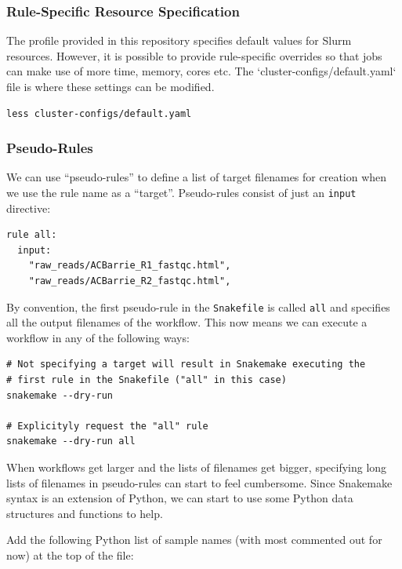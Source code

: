 \subsubsection{Rule-Specific Resource Specification}

The profile provided in this repository specifies default values for Slurm resources.
However, it is possible to provide rule-specific overrides so that jobs can make use of more time, memory, cores etc.
The `cluster-configs/default.yaml` file is where these settings can be modified.

\begin{lstlisting}
less cluster-configs/default.yaml
\end{lstlisting}

\subsubsection{Pseudo-Rules}

We can use ``pseudo-rules'' to define a list of target filenames for creation when we use the rule name as a ``target''.
Pseudo-rules consist of just an \texttt{input} directive:

\begin{lstlisting}
rule all:
  input:
    "raw_reads/ACBarrie_R1_fastqc.html",
    "raw_reads/ACBarrie_R2_fastqc.html",
\end{lstlisting}

By convention, the first pseudo-rule in the \texttt{Snakefile} is called \texttt{all} and specifies all the output filenames of the workflow.
This now means we can execute a workflow in any of the following ways:

\begin{lstlisting}
# Not specifying a target will result in Snakemake executing the
# first rule in the Snakefile ("all" in this case)
snakemake --dry-run

# Explicityly request the "all" rule
snakemake --dry-run all
\end{lstlisting}

When workflows get larger and the lists of filenames get bigger, specifying long lists of filenames in pseudo-rules can start to feel cumbersome.
Since Snakemake syntax is an extension of Python, we can start to use some Python data structures and functions to help.

Add the following Python list of sample names (with most commented out for now) at the top of the file:

